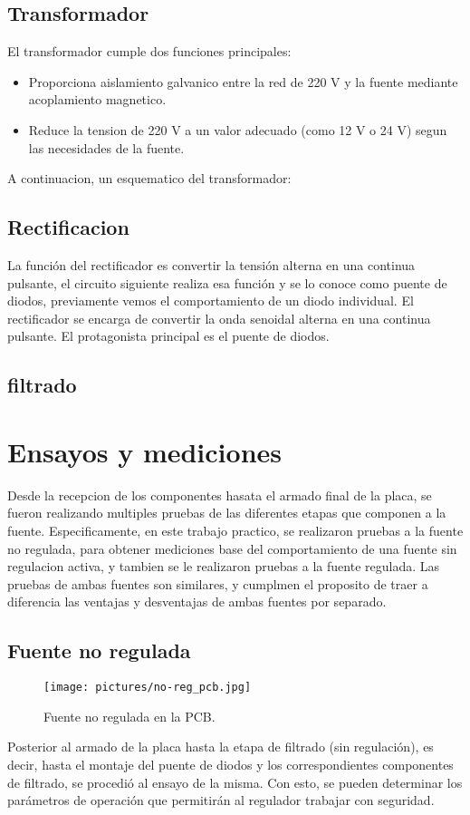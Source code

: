 \documentclass[chaptersright]{informeutn}
\begin{document}
      \section{Transformador}
        El transformador cumple dos funciones principales:
        \begin{itemize}
          \item Proporciona aislamiento galvanico entre la red de 220 V y la fuente mediante acoplamiento magnetico.
          \item Reduce la tension de 220 V a un valor adecuado (como 12 V o 24 V) segun las necesidades de la fuente.
        \end{itemize}
        A continuacion, un esquematico del transformador:
        


      \section{Rectificacion}
        La función del rectificador es convertir la tensión alterna en una continua pulsante, el circuito siguiente 
        realiza esa función y se lo conoce como puente de diodos, previamente vemos el comportamiento de un diodo 
        individual.
        El rectificador se encarga de convertir la onda senoidal alterna en una continua pulsante. El protagonista
        principal es el puente de diodos.

              \section{filtrado}

  \chapter{Ensayos y mediciones}
    Desde la recepcion de los componentes hasata el armado final de la placa, se fueron realizando multiples pruebas
    de las diferentes etapas que componen a la fuente. Especificamente, en este trabajo practico, se realizaron pruebas
    a la fuente no regulada, para obtener mediciones base del comportamiento de una fuente sin regulacion activa, y
    tambien se le realizaron pruebas a la fuente regulada. Las pruebas de ambas fuentes son similares, y cumplmen el
    proposito de traer a diferencia las ventajas y desventajas de ambas fuentes por separado.

    \section{Fuente no regulada}
      \begin{wrapfigure}{r}{0.4\textwidth}
        \centering
        \texttt{[image: pictures/no-reg\_pcb.jpg]}
        \caption{Fuente no regulada en la PCB.}
      \end{wrapfigure}
      Posterior al armado de la placa hasta la etapa de filtrado (sin regulación), es decir, hasta el montaje del
      puente de diodos y los correspondientes componentes de filtrado, se procedió al ensayo de la misma. Con esto,
      se pueden determinar los parámetros de operación que permitirán al regulador trabajar con seguridad.
\end{document}
